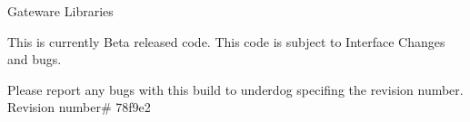 Gateware Libraries

This is currently Beta released code. This code is subject to Interface Changes and bugs.

Please report any bugs with this build to underdog specifing the revision number. Revision number\# 78f9e2 